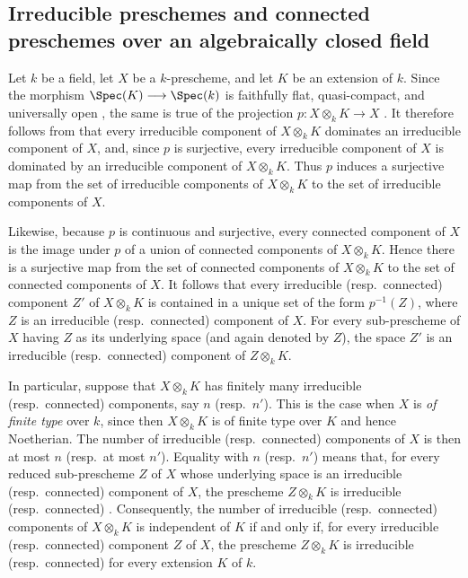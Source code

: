 \subsection{Irreducible preschemes and connected preschemes over an algebraically closed field}
\label{subsection:IV.4.4}

\begin{env}[4.4.1]
\label{IV.4.4.1}
Let $k$ be a field, let $X$ be a $k$-prescheme, and let $K$ be an
extension of $k$.
Since the morphism $\Spec(K)\longrightarrow\Spec(k)$
is faithfully flat, quasi-compact, and universally open
, the same is true of the projection $p:X\otimes_k K\longrightarrow X$
.
It therefore follows from  that every irreducible
component of $X\otimes_k K$ dominates an irreducible component of $X$,
and, since $p$ is surjective, every irreducible component of $X$ is
dominated by an irreducible component of $X\otimes_k K$.
Thus $p$ induces a surjective map from the set of irreducible components
of $X\otimes_k K$ to the set of irreducible components of $X$.

Likewise, because $p$ is continuous and surjective, every connected
component of $X$ is the image under $p$ of a union of connected
components of $X\otimes_k K$.
Hence there is a surjective map from the set of connected components of
$X\otimes_k K$ to the set of connected components of $X$.
It follows that every irreducible (resp.\ connected) component $Z'$ of
$X\otimes_k K$ is contained in a unique set of the form $p^{-1}(Z)$,
where $Z$ is an irreducible (resp.\ connected) component of $X$.
For every sub-prescheme of $X$ having $Z$ as its underlying space (and
again denoted by $Z$), the space $Z'$ is an irreducible
(resp.\ connected) component of $Z\otimes_k K$.

In particular, suppose that $X\otimes_k K$ has finitely many
irreducible (resp.\ connected) components, say $n$ (resp.\ $n'$).
This is the case when $X$ is \emph{of finite type} over $k$, since then
$X\otimes_k K$ is of finite type over $K$ and hence Noetherian.
The number of irreducible (resp.\ connected) components of $X$ is then
at most $n$ (resp.\ at most $n'$).
Equality with $n$ (resp.\ $n'$) means that, for every reduced
sub-prescheme $Z$ of $X$ whose underlying space is an irreducible
(resp.\ connected) component of $X$, the prescheme $Z\otimes_k K$ is
irreducible (resp.\ connected) .
Consequently, the number of irreducible (resp.\ connected) components of
$X\otimes_k K$ is independent of $K$ if and only if, for every
irreducible (resp.\ connected) component $Z$ of $X$, the prescheme
$Z\otimes_k K$ is irreducible (resp.\ connected) for every extension
$K$ of $k$.


\end{env}
